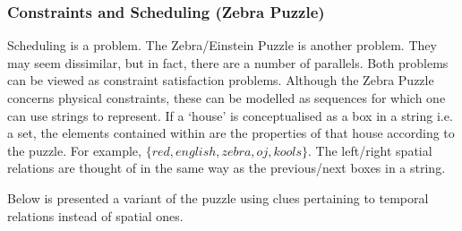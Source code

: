 \documentclass[a4paper,12pt,leqno]{article}
\begin{document}


\subsubsection{Constraints and Scheduling (Zebra Puzzle)}\label{ssub:zebra}
Scheduling is a problem. The Zebra/Einstein Puzzle is another problem. They may seem dissimilar, but in fact, there are a number of parallels. Both problems can be viewed as constraint satisfaction problems. Although the Zebra Puzzle concerns physical constraints, these can be modelled as sequences for which one can use strings to represent. If a `house' is conceptualised as a box in a string i.e. a set, the elements contained within are the properties of that house according to the puzzle. For example, $\{red, english, zebra, oj, kools\}$. The left/right spatial relations are thought of in the same way as the previous/next boxes in a string.

Below is presented a variant of the puzzle using clues pertaining to temporal relations instead of spatial ones.
\end{document}
